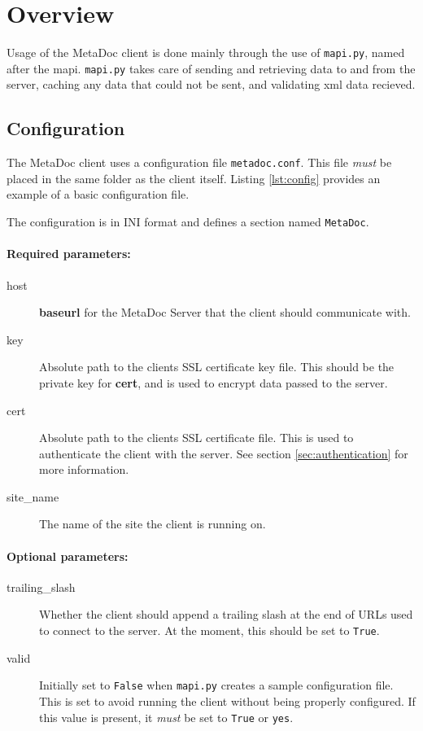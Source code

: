 \newpage
\section{Overview}
\label{sec:overview}
Usage of the MetaDoc client is done mainly through the use of \texttt{mapi.py},
named after the \gls{mapi}.  \texttt{mapi.py} takes care of sending and
retrieving data to and from the server, caching any data that could not be
sent, and validating \gls{xml} data recieved.

\subsection{Configuration}
\label{sec:metadoc_conf}
The MetaDoc client uses a configuration file \texttt{metadoc.conf}. This file
\textit{must} be placed in the same folder as the client itself. Listing
\ref{lst:config} provides an example of a basic configuration file.

The configuration is in INI format and defines a section named
\texttt{MetaDoc}.

\paragraph{Required parameters:}

\begin{description}
    \item[host] \textbf{baseurl} for the MetaDoc Server that the client should
        communicate with.
    \item[key]  Absolute path to the clients SSL certificate key file. This
        should be the private key for \textbf{cert}, and is used to encrypt
        data passed to the server.
    \item[cert] Absolute path to the clients SSL certificate file. This is used
        to authenticate the client with the server. See section
        \ref{sec:authentication} for more information.
    \item[site\_name]   The name of the site the client is running on. 
\end{description}

\paragraph{Optional parameters:}

\begin{description}
    \item[trailing\_slash]  Whether the client should append a trailing slash
        at the end of URLs used to connect to the server. At the moment, this
        should be set to \texttt{True}.
    \item[valid]    Initially set to \texttt{False} when \texttt{mapi.py}
        creates a sample configuration file. This is set to avoid running the
        client without being properly configured. If this value is present, it
        \textit{must} be set to \texttt{True} or \texttt{yes}.
\end{description}

